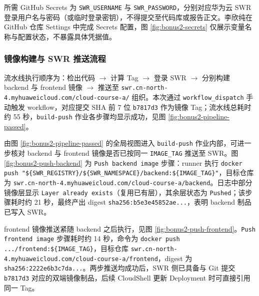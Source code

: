 所需 GitHub Secrets 为 \verb|SWR_USERNAME| 与 \verb|SWR_PASSWORD|，分别对应华为云 SWR 登录用户名与密码（或临时登录密钥），不得提交至代码库或报告正文。李欣纯在 GitHub 仓库 Settings 中完成 Secrets 配置，图 \ref{fig:bonus2-secrets} 仅展示变量名称与配置状态，不暴露具体凭据值。


\subsubsection{镜像构建与 SWR 推送流程}

流水线执行顺序为：检出代码 $\rightarrow$ 计算 Tag $\rightarrow$ 登录 SWR $\rightarrow$ 分别构建 backend 与 frontend 镜像 $\rightarrow$ 推送至 \verb|swr.cn-north-4.myhuaweicloud.com/cloud-course-a/| 组织。本次通过 \verb|workflow_dispatch| 手动触发 workflow，对应提交 SHA 前 7 位 \verb|b7817d3| 作为镜像 Tag；流水线总耗时约 55 秒，\verb|build-push| 作业各步骤均显示成功，见图 \ref{fig:bonus2-pipeline-passed}。


由图 \ref{fig:bonus2-pipeline-passed} 的全局视图进入 \verb|build-push| 作业内部，可进一步核对 backend 与 frontend 镜像是否已按同一 \verb|IMAGE_TAG| 推送至 SWR。图 \ref{fig:bonus2-push-backend} 为 \verb|Push backend image| 步骤：runner 执行 \verb|docker push "${SWR_REGISTRY}/${SWR_NAMESPACE}/backend:${IMAGE_TAG}"|，目标仓库为 \verb|swr.cn-north-4.myhuaweicloud.com/cloud-course-a/backend|。日志中部分镜像层显示 \verb|Layer already exists|（复用已有层），其余层状态为 \verb|Pushed|；该步骤耗时约 21 秒，最终产出 digest \verb|sha256:b5e3e45852ae...|，表明 backend 制品已写入 SWR。


frontend 镜像推送紧随 backend 之后执行，见图 \ref{fig:bonus2-push-frontend}。\verb|Push frontend image| 步骤耗时约 14 秒，命令为 \verb|docker push .../frontend:${IMAGE_TAG}|，目标仓库 \verb|swr.cn-north-4.myhuaweicloud.com/cloud-course-a/frontend|，digest 为 \verb|sha256:2222e6b3c7da...|。两步推送均成功后，SWR 侧已具备与 Git 提交 \verb|b7817d3| 对应的双端镜像制品，后续 CloudShell 更新 Deployment 时可直接引用同一 Tag。

